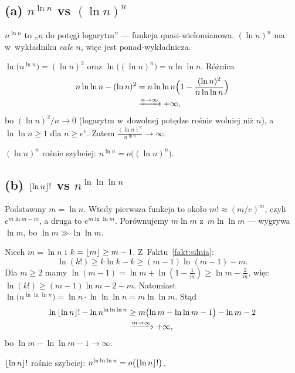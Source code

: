 \documentclass[11pt]{article}
\begin{document}
\subsection*{(a) $n^{\ln n}$ vs $(\ln n)^n$}
\begin{intuicja}
$n^{\ln n}$ to „$n$ do potęgi logarytm” --- funkcja quasi-wielomianowa.
$(\ln n)^n$ ma w~wykładniku \emph{całe} $n$, więc jest ponad-wykładnicza.
\end{intuicja}
\formalnie
$\ln\bigl(n^{\ln n}\bigr) = (\ln n)^2$ oraz $\ln\bigl((\ln n)^n\bigr) = n\ln\ln n$.
Różnica
\begin{align*}
n\ln\ln n - (\ln n)^2 &= n\ln\ln n\Bigl(1 - \frac{(\ln n)^2}{n\ln\ln n}\Bigr)\\
&\xrightarrow{n\to\infty}+\infty,
\end{align*}
bo $(\ln n)^2/n\to 0$ (logarytm w~dowolnej potędze rośnie wolniej niż $n$),
a $\ln\ln n\ge 1$ dla $n\ge e^e$. Zatem $\frac{(\ln n)^n}{n^{\ln n}}\to\infty$.
\begin{odpowiedz}
$(\ln n)^n$ rośnie szybciej: $n^{\ln n} = o\bigl((\ln n)^n\bigr)$.
\end{odpowiedz}

\subsection*{(b) $\left\lfloor \ln n \right\rfloor!$ vs $n^{\ln\ln\ln n}$}
\begin{intuicja}
Podstawmy $m=\ln n$. Wtedy pierwsza funkcja to około $m!\approx (m/e)^m$,
czyli $e^{m\ln m - m}$, a druga to $e^{m\ln\ln m}$. Porównujemy $m\ln m$
z~$m\ln\ln m$ --- wygrywa $\ln m$, bo $\ln m \gg \ln\ln m$.
\end{intuicja}
\formalnie
Niech $m=\ln n$ i $k=\left\lfloor m \right\rfloor\ge m-1$. Z~Faktu~\ref{fakt:silnia}:
\[
\ln(k!) \ge k\ln k - k \ge (m-1)\ln(m-1) - m .
\]
Dla $m\ge 2$ mamy $\ln(m-1)=\ln m+\ln(1-\tfrac1m)\ge \ln m-\tfrac2m$, więc
$\ln(k!)\ge (m-1)\ln m - 2 - m$. Natomiast
$\ln\bigl(n^{\ln\ln\ln n}\bigr)=\ln n\cdot\ln\ln\ln n = m\ln\ln m$. Stąd
\begin{align*}
\ln\left\lfloor \ln n \right\rfloor! - \ln n^{\ln\ln\ln n} &\ge m\bigl(\ln m - \ln\ln m - 1\bigr) - \ln m - 2\\
&\xrightarrow{m\to\infty} +\infty,
\end{align*}
bo $\ln m - \ln\ln m - 1\to\infty$.
\begin{odpowiedz}
$\left\lfloor \ln n \right\rfloor!$ rośnie szybciej: $n^{\ln\ln\ln n} = o\bigl(\left\lfloor \ln n \right\rfloor!\bigr)$.
\end{odpowiedz}
\end{document}

